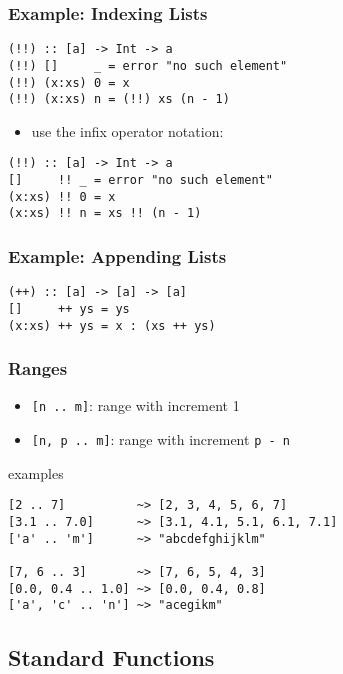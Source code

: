 \documentclass[dvipsnames]{beamer}
\theoremstyle{plain}
\begin{document}
\begin{frame}[fragile]
  \frametitle{Example: Indexing Lists}

  \begin{lstlisting}
(!!) :: [a] -> Int -> a
(!!) []     _ = error "no such element"
(!!) (x:xs) 0 = x
(!!) (x:xs) n = (!!) xs (n - 1)
  \end{lstlisting}

  \pause
  \begin{itemize}
    \item use the infix operator notation:
  \end{itemize}

  \begin{lstlisting}
(!!) :: [a] -> Int -> a
[]     !! _ = error "no such element"
(x:xs) !! 0 = x
(x:xs) !! n = xs !! (n - 1)
  \end{lstlisting}
\end{frame}

\begin{frame}[fragile]
  \frametitle{Example: Appending Lists}

  \begin{lstlisting}
(++) :: [a] -> [a] -> [a]
[]     ++ ys = ys
(x:xs) ++ ys = x : (xs ++ ys)
  \end{lstlisting}
\end{frame}

\begin{frame}[fragile]
  \frametitle{Ranges}

  \begin{itemize}
    \item \lstinline|[n .. m]|: range with increment 1
    \item \lstinline|[n, p .. m]|: range with increment \texttt{p - n}
  \end{itemize}

  \begin{exampleblock}{examples}
    \begin{lstlisting}
[2 .. 7]          ~> [2, 3, 4, 5, 6, 7]
[3.1 .. 7.0]      ~> [3.1, 4.1, 5.1, 6.1, 7.1]
['a' .. 'm']      ~> "abcdefghijklm"

[7, 6 .. 3]       ~> [7, 6, 5, 4, 3]
[0.0, 0.4 .. 1.0] ~> [0.0, 0.4, 0.8]
['a', 'c' .. 'n'] ~> "acegikm"
    \end{lstlisting}
  \end{exampleblock}
\end{frame}

\subsection{Standard Functions}
\end{document}
